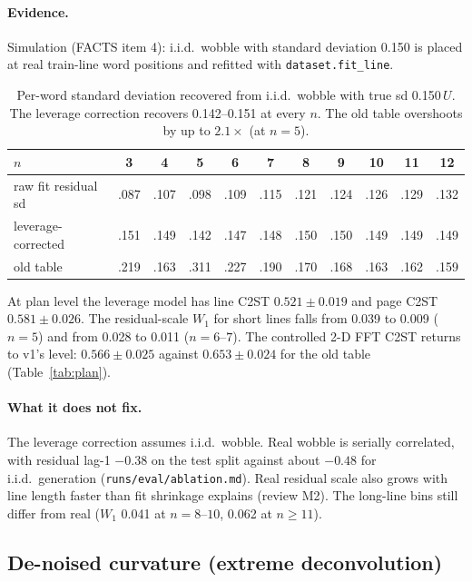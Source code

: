 \documentclass[11pt,a4paper]{article}
\newcommand{\U}{\ensuremath{U}}
\newcommand{\src}[1]{{\footnotesize\texttt{#1}}}
\begin{document}
\paragraph{Evidence.} Simulation (FACTS item 4): i.i.d.\ wobble with standard
deviation 0.150 is placed at real train-line word positions and refitted with
\texttt{dataset.fit\_line}.
\begin{table}[H]\centering\small
\begin{tabular}{lcccccccccc}
\toprule
$n$ & 3 & 4 & 5 & 6 & 7 & 8 & 9 & 10 & 11 & 12\\
\midrule
raw fit residual sd & .087 & .107 & .098 & .109 & .115 & .121 & .124 & .126 & .129 & .132\\
leverage-corrected  & .151 & .149 & .142 & .147 & .148 & .150 & .150 & .149 & .149 & .149\\
old table           & .219 & .163 & .311 & .227 & .190 & .170 & .168 & .163 & .162 & .159\\
\bottomrule
\end{tabular}
\caption{Per-word standard deviation recovered from i.i.d.\ wobble with true
sd 0.150\,\U. The leverage correction recovers 0.142--0.151 at every $n$. The
old table overshoots by up to $2.1\times$ (at $n=5$).}
\label{tab:levsim}
\end{table}
At plan level the leverage model has line C2ST $0.521\pm0.019$ and page C2ST
$0.581\pm0.026$. The residual-scale $W_1$ for short lines falls from 0.039 to
0.009 ($n=5$) and from 0.028 to 0.011 ($n=6$--$7$). The controlled 2-D FFT
C2ST returns to v1's level: $0.566\pm0.025$ against $0.653\pm0.024$ for the
old table (Table~\ref{tab:plan}).

\paragraph{What it does not fix.} The leverage correction assumes i.i.d.\
wobble. Real wobble is serially correlated, with residual lag-1 $-0.38$ on the
test split against about $-0.48$ for i.i.d.\ generation
(\src{runs/eval/ablation.md}). Real residual scale also grows with line length
faster than fit shrinkage explains (review M2). The long-line bins still differ
from real ($W_1$ 0.041 at $n=8$--$10$, 0.062 at $n\ge11$).

\subsection{De-noised curvature (extreme deconvolution)}
\label{sec:dc}
\end{document}
